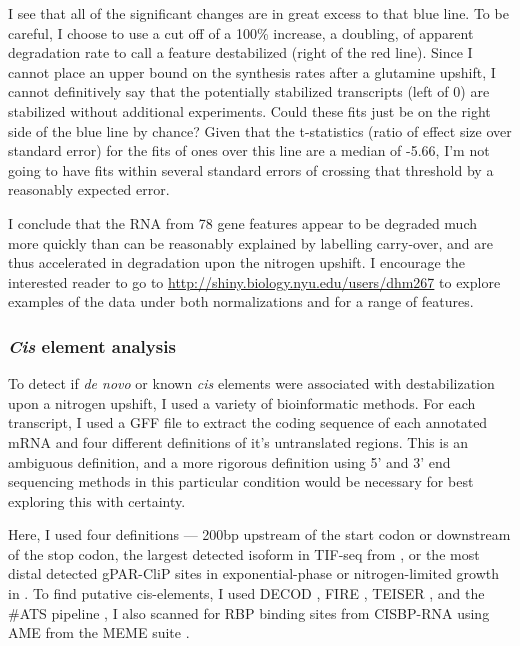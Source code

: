 I see that all of the significant changes are in great excess to that
blue line. To be careful, I choose to use a cut off of a 100\%
increase, a doubling, of apparent degradation rate to call a feature
destabilized (right of the red line). Since I cannot place an upper
bound on the synthesis rates after a glutamine upshift, I cannot
definitively say that the potentially stabilized transcripts (left of 0)
are stabilized without additional experiments.
Could these fits just be on the right side of the blue line by chance?
Given that the t-statistics (ratio of effect size over standard error)
for the fits of ones over this line are a median of -5.66,
I'm not going to have fits within several standard errors of
crossing that threshold by a reasonably expected error.

I conclude that the RNA from 78 gene
features appear to be degraded much more quickly than can be reasonably
explained by labelling carry-over, and are thus accelerated in
degradation upon the nitrogen upshift.
I encourage the interested reader to go to
\url{http://shiny.biology.nyu.edu/users/dhm267} to explore examples of
the data under both normalizations and for a range of features.

\subsubsection{\textit{Cis} element analysis}

To detect if \textit{de novo} or known \textit{cis} elements were 
associated with destabilization upon a nitrogen upshift,
I used a variety of bioinformatic methods.  
For each transcript, I used a GFF file to extract the coding sequence
of each annotated mRNA and four different definitions of it's
untranslated regions. This is an ambiguous definition, and a more
rigorous definition using 5' and 3' end sequencing methods in this
particular condition would be necessary for best exploring this with
certainty. 

Here, I used four definitions --- 
200bp upstream of the start codon or downstream
of the stop codon, the largest detected isoform in TIF-seq from
\parencite{pelechano2014genome}, 
or the most distal detected gPAR-CliP sites in
exponential-phase or nitrogen-limited growth in 
\parencite{freeberg2013pervasive}.
To find putative cis-elements, 
I used DECOD \parencite{huggins2011decod}, 
FIRE \parencite{elemento2007universal},
TEISER \parencite{goodarzi2012systematic},
and the \#ATS pipeline \parencite{li2010predicting},
I also scanned for RBP binding sites from
CISBP-RNA \parencite{ray2013compendium}
using AME from the MEME suite \parencite{mcleay2010motif}.

